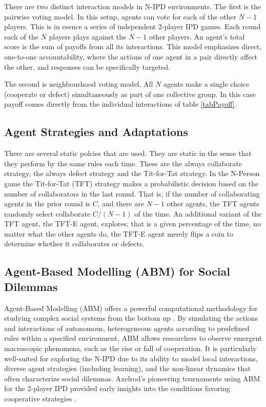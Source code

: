 \documentclass[]{llncs} %
\begin{document}
There are  two distinct interaction models in N-IPD environments.
The first is the pairwise voting model. In this setup, agents can
vote for each of the other $N-1$ players.  This is in esence a series of
independent 2-player IPD games. Each round each of the $N$ players plays
against the $N-1$ other players. An
agent's total score is the sum of payoffs from all its interactions. This
model emphasizes direct, one-to-one accountability,
where the actions of one agent in a pair directly affect the other,
and responses can be specifically targeted.

The second is neighbourhood voting model.  All $N$ agents make a
single choice (cooperate or defect) simultaneously as part of one
collective group. In this case payoff comes directly from the individual
interactions of table \ref {tabPayoff}.

\subsection{Agent Strategies and Adaptations}

There are several static polcies that are used.  They are static in
the sense that they perform by the same rules each time.  These are
the always collaborate strategy, the always defect strategy and the
Tit-for-Tat strategy.  In the N-Person game the Tit-for-Tat (TFT)
strategy makes a probabilistic decision based on the number of
collaborators in the last round.  That is, if the number of
collaborating agents in the prior round is $C$, and there are $N-1$
other agents, the TFT agents randomly select collaborate $C/(N-1)$ of
the time.  An additional variant of the TFT agent, the TFT-E agent,
explores; that is a given percentage of the time, no matter what the
other agents do, the TFT-E agent merely flips a coin to determine whether
it collaborates or defects.

\subsection{Agent-Based Modelling (ABM) for Social Dilemmas}
Agent-Based Modelling (ABM) offers a powerful computational
methodology for studying complex social systems from the bottom up
\cite{Gilbert2019,Macal2010}. By simulating the actions and
interactions of autonomous, heterogeneous agents according to
predefined rules within a specified environment, ABM allows
researchers to observe emergent macroscopic phenomena, such as the
rise or fall of cooperation. It is particularly well-suited for
exploring the N-IPD due to its ability to model local interactions,
diverse agent strategies (including learning), and the non-linear
dynamics that often characterize social dilemmas. Axelrod's pioneering
tournaments using ABM for the 2-player IPD provided early insights
into the conditions favoring cooperative strategies \cite{Axelrod}.
\end{document}
